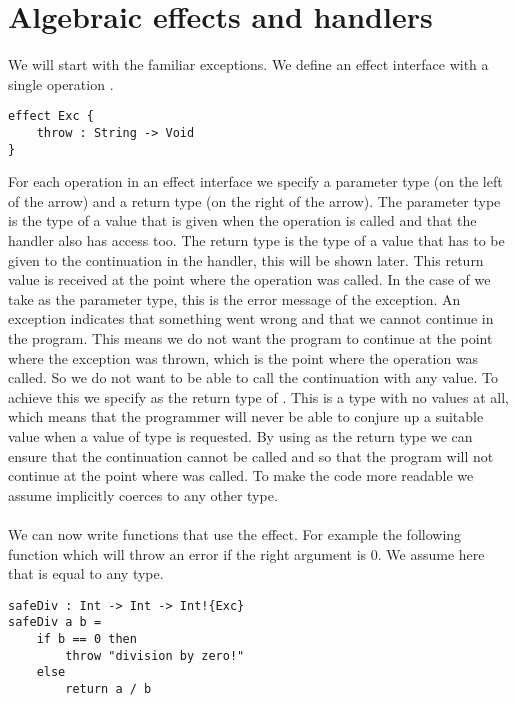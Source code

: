 \section{Algebraic effects and handlers} \label{section:background-algeff}
We will start with the familiar exceptions. We define an  effect interface with a single operation .

\begin{verbatim}
effect Exc {
	throw : String -> Void
}
\end{verbatim}

For each operation in an effect interface we specify a parameter type (on the left of the arrow) and a return type (on the right of the arrow).
The parameter type is the type of a value that is given when the operation is called and that the handler also has access too.
The return type is the type of a value that has to be given to the continuation in the handler, this will be shown later.
This return value is received at the point where the operation was called.
In the case of  we take  as the parameter type, this is the error message of the exception.
An exception indicates that something went wrong and that we cannot continue in the program.
This means we do not want the program to continue at the point where the exception was thrown, which is the point where the  operation was called.
So we do not want to be able to call the continuation with any value.
To achieve this we specify  as the return type of .
This is a type with no values at all, which means that the programmer will never be able to conjure up a suitable value when a value of type  is requested. By using  as the return type we can ensure that the continuation cannot be called and so that the program will not continue at the point where  was called. To make the code more readable we assume  implicitly coerces to any other type.
\\\\
We can now write functions that use the  effect.
For example the following function  which will throw an error if the right argument is $0$.
We assume here that  is equal to any type.

\begin{verbatim}
safeDiv : Int -> Int -> Int!{Exc}
safeDiv a b =
	if b == 0 then
		throw "division by zero!"
	else
		return a / b
\end{verbatim}

